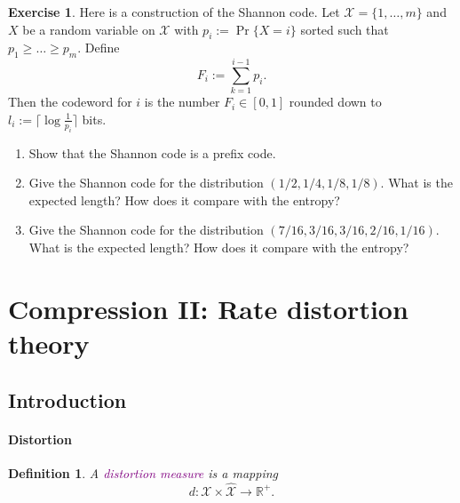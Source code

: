 \documentclass[a4paper, 11pt, openany]{book}
\numberwithin{equation}{section}
\theoremstyle{plain}
\newtheorem{definition}	[equation]	{Definition}
\theoremstyle{definition}
\newtheorem{exercise}   {Exercise}  [section]
\newcommand{\Define}[1]{\textcolor{purple}{#1}}
\newcommand{\alphabet}[1]{\mathcal{#1}}
\begin{document}
\begin{exercise}
Here is a construction of the Shannon code. Let $\alphabet{X} = \{1,\ldots,m\}$ and $X$ be a random variable on $\alphabet{X}$ with $p_i := \Pr\{ X = i\}$ sorted such that $p_1 \ge \dots \ge p_m$. Define
$$
	F_i := \sum_{k=1}^{i-1} p_i.
$$
Then the codeword for $i$ is the number $F_i \in [0,1]$ rounded down to $l_i := \lceil \log \frac{1}{p_i} \rceil$ bits.

\begin{enumerate}
	\item Show that the Shannon code is a prefix code.
	
	\item Give the Shannon code for the distribution $(1/2, 1/4, 1/8, 1/8)$. What is the expected length? How does it compare with the entropy?
	
	\item Give the Shannon code for the distribution $(7/16, 3/16, 3/16, 2/16, 1/16)$. What is the expected length? How does it compare with the entropy?
\end{enumerate}
\end{exercise}
























\section{Compression II: Rate distortion theory}
\label{sec:36}



\subsection{Introduction}


\paragraph{Distortion}
\begin{definition}
A \Define{distortion measure} is a mapping
$$
	d: \alphabet{X} \times \hat{\alphabet{X}} \to \mathbb{R}^+.
$$
\end{definition}
\end{document}
